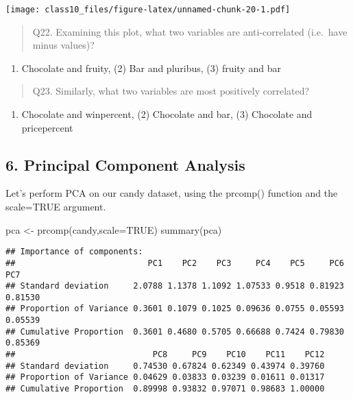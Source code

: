 \documentclass[
]{article}
\newenvironment{Shaded}{\begin{snugshade}}{\end{snugshade}}
\newcommand{\AttributeTok}[1]{\textcolor[rgb]{0.77,0.63,0.00}{#1}}
\newcommand{\ConstantTok}[1]{\textcolor[rgb]{0.00,0.00,0.00}{#1}}
\newcommand{\FunctionTok}[1]{\textcolor[rgb]{0.00,0.00,0.00}{#1}}
\newcommand{\NormalTok}[1]{#1}
\newcommand{\OtherTok}[1]{\textcolor[rgb]{0.56,0.35,0.01}{#1}}
\providecommand{\tightlist}{%
  \setlength{\itemsep}{0pt}\setlength{\parskip}{0pt}}
\begin{document}
\texttt{[image: class10\_files/figure-latex/unnamed-chunk-20-1.pdf]}

\begin{quote}
Q22. Examining this plot, what two variables are anti-correlated
(i.e.~have minus values)?
\end{quote}

\begin{enumerate}
\def\labelenumi{(\arabic{enumi})}
\tightlist
\item
  Chocolate and fruity, (2) Bar and pluribus, (3) fruity and bar
\end{enumerate}

\begin{quote}
Q23. Similarly, what two variables are most positively correlated?
\end{quote}

\begin{enumerate}
\def\labelenumi{(\arabic{enumi})}
\tightlist
\item
  Chocolate and winpercent, (2) Chocolate and bar, (3) Chocolate and
  pricepercent
\end{enumerate}

\hypertarget{principal-component-analysis}{%
\subsection{6. Principal Component
Analysis}\label{principal-component-analysis}}

Let's perform PCA on our candy dataset, using the prcomp() function and
the scale=TRUE argument.

\begin{Shaded}
\begin{Highlighting}[]
\NormalTok{pca }\OtherTok{\textless{}{-}} \FunctionTok{prcomp}\NormalTok{(candy,}\AttributeTok{scale=}\ConstantTok{TRUE}\NormalTok{)}
\FunctionTok{summary}\NormalTok{(pca)}
\end{Highlighting}
\end{Shaded}

\begin{verbatim}
## Importance of components:
##                           PC1    PC2    PC3     PC4    PC5     PC6     PC7
## Standard deviation     2.0788 1.1378 1.1092 1.07533 0.9518 0.81923 0.81530
## Proportion of Variance 0.3601 0.1079 0.1025 0.09636 0.0755 0.05593 0.05539
## Cumulative Proportion  0.3601 0.4680 0.5705 0.66688 0.7424 0.79830 0.85369
##                            PC8     PC9    PC10    PC11    PC12
## Standard deviation     0.74530 0.67824 0.62349 0.43974 0.39760
## Proportion of Variance 0.04629 0.03833 0.03239 0.01611 0.01317
## Cumulative Proportion  0.89998 0.93832 0.97071 0.98683 1.00000
\end{verbatim}
\end{document}
